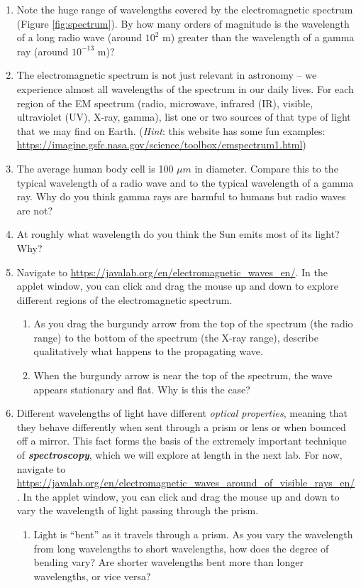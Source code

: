 \documentclass[11pt]{article}
\begin{document}
\begin{enumerate}
    \item Note the huge range of wavelengths covered by the electromagnetic spectrum (Figure \ref{fig:spectrum}). By how many orders of magnitude is the wavelength of a long radio wave (around $10^2$ m) greater than the wavelength of a gamma ray (around $10^{-13}$ m)? 
    
    \item The electromagnetic spectrum is not just relevant in astronomy -- we experience almost all wavelengths of the spectrum in our daily lives. For each region of the EM spectrum (radio, microwave, infrared (IR), visible, ultraviolet (UV), X-ray, gamma), list one or two sources of that type of light that we may find on Earth. (\textit{Hint}: this website has some fun examples: \url{https://imagine.gsfc.nasa.gov/science/toolbox/emspectrum1.html})
    
    \item The average human body cell is 100 $\mu m$ in diameter. Compare this to the typical wavelength of a radio wave and to the typical wavelength of a gamma ray. Why do you think gamma rays are harmful to humans but radio waves are not?
    
    \item At roughly what wavelength do you think the Sun emits most of its light? Why?
    
    \item Navigate to \url{https://javalab.org/en/electromagnetic_waves_en/}. In the applet window, you can click and drag the mouse up and down to explore different regions of the electromagnetic spectrum.
    \begin{enumerate}
        \item As you drag the burgundy arrow from the top of the spectrum (the radio range) to the bottom of the spectrum (the X-ray range), describe qualitatively what happens to the propagating wave.
        
        \item When the burgundy arrow is near the top of the spectrum, the wave appears stationary and flat. Why is this the case?
    \end{enumerate}
    
    \item Different wavelengths of light have different \emph{optical properties}, meaning that they behave differently when sent through a prism or lens or when bounced off a mirror. This fact forms the basis of the extremely important technique of \textbf{\emph{spectroscopy}}, which we will explore at length in the next lab. For now, navigate to \url{https://javalab.org/en/electromagnetic_waves_around_of_visible_rays_en/}. In the applet window, you can click and drag the mouse up and down to vary the wavelength of light passing through the prism.
    \begin{enumerate}
        \item Light is ``bent'' as it travels through a prism. As you vary the wavelength from long wavelengths to short wavelengths, how does the degree of bending vary? Are shorter wavelengths bent more than longer wavelengths, or vice versa?
        

\end{enumerate}
\end{enumerate}
\end{document}
